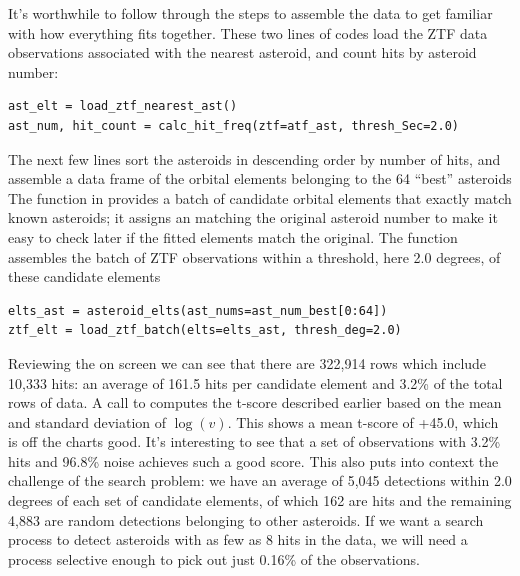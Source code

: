 It's worthwhile to follow through the steps to assemble the data to get familiar with how everything fits together.
These two lines of codes load the ZTF data observations associated with the nearest asteroid, and count hits by asteroid number:
\begin{lstlisting}[style=CodeSnippet]
ast_elt = load_ztf_nearest_ast()
ast_num, hit_count = calc_hit_freq(ztf=atf_ast, thresh_Sec=2.0)
\end{lstlisting}
The next few lines sort the asteroids in descending order by number of hits, 
and assemble a data frame of the orbital elements belonging to the 64 ``best'' asteroids
The function  in  provides a batch of candidate orbital elements
that exactly match known asteroids; it assigns an  matching the original asteroid number to make it easy
to check later if the fitted elements match the original.
The function  assembles the batch of ZTF observations within a threshold, 
here 2.0 degrees, of these candidate elements
\begin{lstlisting}[style=CodeSnippet]
elts_ast = asteroid_elts(ast_nums=ast_num_best[0:64])
ztf_elt = load_ztf_batch(elts=elts_ast, thresh_deg=2.0)
\end{lstlisting}

Reviewing the  on screen we can see that there are 322,914 rows which include 10,333 hits:
an average of 161.5 hits per candidate element and 3.2\% of the total rows of data.
A call to  computes the t-score described earlier based on the mean and standard deviation of $\log(v)$.
This shows a mean t-score of +45.0, which is off the charts good.
It's interesting to see that a set of observations with 3.2\% hits and 96.8\% noise achieves such a good score.
This also puts into context the challenge of the search problem: 
we have an average of 5,045 detections within 2.0 degrees of each set of candidate elements,
of which 162 are hits and the remaining 4,883 are random detections belonging to other asteroids.
If we want a search process to detect asteroids with as few as 8 hits in the data, 
we will need a process selective enough to pick out just 0.16\% of the observations.

